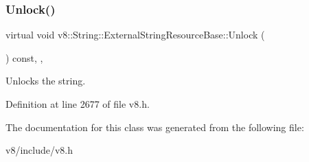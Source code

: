 \subsubsection{\texorpdfstring{Unlock()}{Unlock()}}
{\footnotesize\ttfamily virtual void v8\+::\+String\+::\+External\+String\+Resource\+Base\+::\+Unlock (\begin{DoxyParamCaption}{ }\end{DoxyParamCaption}) const\hspace{0.3cm}{\ttfamily [inline]}, {\ttfamily [protected]}, {\ttfamily [virtual]}}

Unlocks the string. 

Definition at line 2677 of file v8.\+h.



The documentation for this class was generated from the following file\+:\begin{DoxyCompactItemize}
\item 
v8/include/v8.\+h\end{DoxyCompactItemize}
